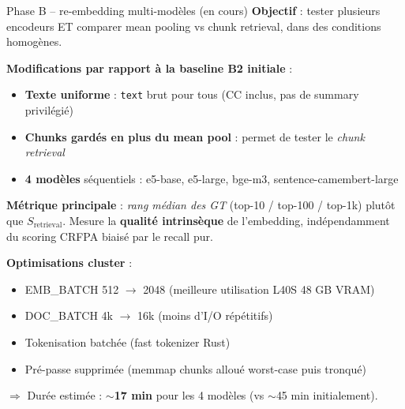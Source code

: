 \documentclass[aspectratio=169,10pt]{beamer}
\begin{document}
\begin{frame}{Phase B -- re-embedding multi-modèles (en cours)}
  \footnotesize
  \textbf{Objectif} : tester plusieurs encodeurs ET comparer mean pooling vs chunk retrieval, dans des conditions homogènes.

  \vspace{0.4em}
  \textbf{Modifications par rapport à la baseline B2 initiale} :
  \begin{itemize}\footnotesize
    \item \textbf{Texte uniforme} : \texttt{text} brut pour tous (CC inclus, pas de summary privilégié)
    \item \textbf{Chunks gardés en plus du mean pool} : permet de tester le \textit{chunk retrieval}
    \item \textbf{4 modèles} séquentiels : e5-base, e5-large, bge-m3, sentence-camembert-large
  \end{itemize}

  \vspace{0.4em}
  \textbf{Métrique principale} : \textit{rang médian des GT} (top-10 / top-100 / top-1k) plutôt que \(S_{\text{retrieval}}\).
  Mesure la \textbf{qualité intrinsèque} de l'embedding, indépendamment du scoring CRFPA biaisé par le recall pur.

  \vspace{0.4em}
  \textbf{Optimisations cluster} :
  \begin{itemize}\footnotesize
    \item EMB\_BATCH 512 $\to$ 2048 (meilleure utilisation L40S 48 GB VRAM)
    \item DOC\_BATCH 4k $\to$ 16k (moins d'I/O répétitifs)
    \item Tokenisation batchée (fast tokenizer Rust)
    \item Pré-passe supprimée (memmap chunks alloué worst-case puis tronqué)
  \end{itemize}

  \vspace{0.3em}
  $\Rightarrow$ Durée estimée : \textbf{$\sim$17 min} pour les 4 modèles (vs $\sim$45 min initialement).
\end{frame}
\end{document}
